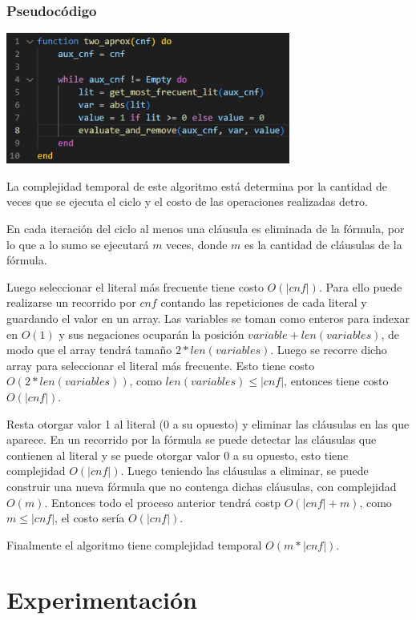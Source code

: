 \documentclass{article}
\begin{document}
        \subsubsection*{Pseudocódigo}
            \includegraphics[width = 0.7\textwidth]{resources/code5.png}

            La complejidad temporal de este algoritmo está determina por la cantidad 
            de veces que se ejecuta el ciclo y el costo de las operaciones realizadas
            detro. 
            
            En cada iteración del ciclo al menos una cláusula es eliminada de la fórmula,
            por lo que a lo sumo se ejecutará $m$ veces, donde $m$ es la cantidad de cláusulas
            de la fórmula.

            Luego seleccionar el literal más frecuente tiene costo $O(|cnf|)$. Para ello
            puede realizarse un recorrido por $cnf$ contando las repeticiones de cada literal y 
            guardando el valor en un array. Las variables se toman como enteros para indexar en $O(1)$ 
            y sus negaciones ocuparán la posición $variable + len(variables)$, de modo que 
            el array tendrá tamaño $2*len(variables)$.
            Luego se recorre dicho array para seleccionar el literal más frecuente. Esto tiene
            costo $O(2*len(variables))$, como $len(variables) \leq |cnf|$, entonces tiene costo $O(|cnf|)$.

            Resta otorgar valor 1 al literal (0 a su opuesto) y eliminar las cláusulas en las que aparece. 
            En un recorrido por la fórmula se puede detectar las cláusulas que contienen al literal y se puede otorgar
            valor 0 a su opuesto, esto tiene complejidad $O(|cnf|)$. 
            Luego teniendo las cláusulas a eliminar, se puede construir una nueva fórmula que no contenga 
            dichas cláusulas, con complejidad $O(m)$. Entonces todo el proceso anterior tendrá
            costp $O(|cnf| + m)$, como $m \leq |cnf|$, el costo sería $O(|cnf|)$.
            
            Finalmente el algoritmo tiene complejidad temporal $O(m*|cnf|)$. 

\section*{Experimentación}


\end{document}
